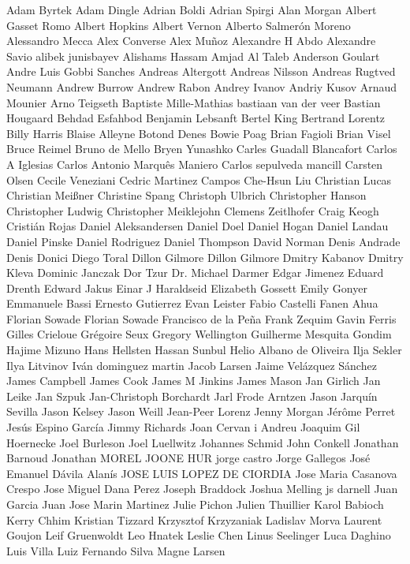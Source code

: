 \documentclass{scrreprt}
\begin{document}
Adam Byrtek
Adam Dingle
Adrian Boldi
Adrian Spirgi
Alan Morgan
Albert Gasset Romo
Albert Hopkins
Albert Vernon
Alberto Salmerón Moreno
Alessandro Mecca
Alex Converse
Alex Muñoz
Alexandre H Abdo
Alexandre Savio
alibek junisbayev
Alishams Hassam
Amjad Al Taleb
Anderson Goulart
Andre Luis Gobbi Sanches
Andreas Altergott
Andreas Nilsson
Andreas Rugtved Neumann
Andrew Burrow
Andrew Rabon
Andrey Ivanov
Andriy Kusov
Arnaud Mounier
Arno Teigseth
Baptiste Mille-Mathias
bastiaan van der veer
Bastian Hougaard
Behdad Esfahbod
Benjamin Lebsanft
Bertel King
Bertrand Lorentz
Billy Harris
Blaise Alleyne
Botond Denes
Bowie Poag
Brian Fagioli
Brian Visel
Bruce Reimel
Bruno de Mello
Bryen Yunashko
Carles Guadall Blancafort
Carlos A Iglesias
Carlos Antonio Marquês Maniero
Carlos sepulveda mancill
Carsten Olsen
Cecile Veneziani
Cedric Martinez Campos
Che-Hsun Liu
Christian Lucas
Christian Meißner
Christine Spang
Christoph Ulbrich
Christopher Hanson
Christopher Ludwig
Christopher Meiklejohn
Clemens Zeitlhofer
Craig Keogh
Cristián Rojas
Daniel Aleksandersen
Daniel Doel
Daniel Hogan
Daniel Landau
Daniel Pinske
Daniel Rodriguez
Daniel Thompson
David Norman
Denis Andrade
Denis Donici
Diego Toral
Dillon Gilmore
Dillon Gilmore
Dmitry Kabanov
Dmitry Kleva
Dominic Janczak
Dor Tzur
Dr. Michael Darmer
Edgar Jimenez
Eduard Drenth
Edward Jakus
Einar J Haraldseid
Elizabeth Gossett
Emily Gonyer
Emmanuele Bassi
Ernesto Gutierrez
Evan Leister
Fabio Castelli
Fanen Ahua
Florian Sowade Florian Sowade
Francisco de la Peña
Frank Zequim
Gavin Ferris
Gilles Crieloue
Grégoire Seux
Gregory Wellington
Guilherme Mesquita Gondim
Hajime Mizuno
Hans Hellsten
Hassan Sunbul
Helio Albano de Oliveira
Ilja Sekler
Ilya Litvinov
Iván dominguez martin
Jacob Larsen
Jaime Velázquez Sánchez
James Campbell
James Cook
James M Jinkins
James Mason
Jan Girlich
Jan Leike
Jan Szpuk
Jan-Christoph Borchardt
Jarl Frode Arntzen
Jason Jarquín Sevilla
Jason Kelsey
Jason Weill
Jean-Peer Lorenz
Jenny Morgan
Jérôme Perret
Jesús Espino García
Jimmy Richards
Joan Cervan i Andreu
Joaquim Gil Hoernecke
Joel Burleson
Joel Luellwitz
Johannes Schmid
John Conkell
Jonathan Barnoud
Jonathan MOREL
JOONE HUR
jorge castro
Jorge Gallegos
José Emanuel Dávila Alanís
JOSE LUIS LOPEZ DE CIORDIA
Jose Maria Casanova Crespo
Jose Miguel Dana Perez
Joseph Braddock
Joshua Melling
js darnell
Juan Garcia
Juan Jose Marin Martinez
Julie Pichon
Julien Thuillier
Karol Babioch
Kerry Chhim
Kristian Tizzard
Krzysztof Krzyzaniak
Ladislav Morva
Laurent Goujon
Leif Gruenwoldt
Leo Hnatek
Leslie Chen
Linus Seelinger
Luca Daghino
Luis Villa
Luiz Fernando Silva
Magne Larsen
\end{document}
